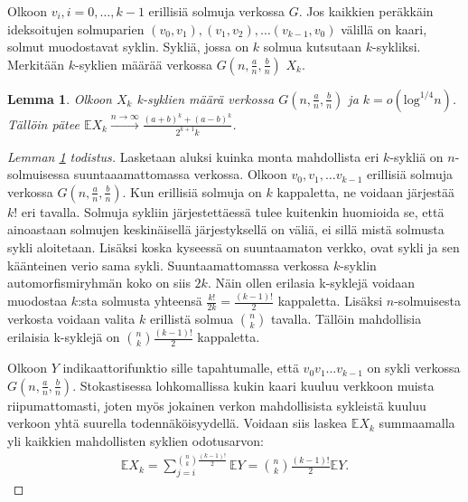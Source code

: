 \documentclass[finnish,12pt,a4paper,pdftex,sci,utf8]{aaltothesis}
\newtheorem{lemma}{Lemma}
\begin{document}
Olkoon $v_i, i = 0, \ldots, k-1$ erillisiä solmuja verkossa $G$. Jos kaikkien peräkkäin ideksoitujen solmuparien $(v_0, v_1), (v_1, v_2), \ldots (v_{k-1}, v_0)$ välillä on kaari, solmut muodostavat syklin. Sykliä, jossa on $k$ solmua kutsutaan $k$-sykliksi. Merkitään $k$-syklien määrää verkossa $G(n, \frac{a}{n}, \frac{b}{n})$ $X_k$.

\begin{lemma}
	\label{lemma:k-syklit_odotus}
	Olkoon $X_k$ k-syklien määrä verkossa $G(n,\frac{a}{n},\frac{b}{n})$ ja $k = o(\text{log}^{1/4}n)$. Tällöin pätee $\mathbb{E}X_k \xrightarrow{n \rightarrow \infty} \frac{(a+b)^k + (a-b)^k}{2^{k+1}k}$.
\end{lemma}

\begin{proof}[Lemman \ref{lemma:k-syklit_odotus} todistus]
	Lasketaan aluksi kuinka monta mahdollista eri $k$-sykliä on $n$-solmuisessa suuntaaamattomassa verkossa. Olkoon $v_0, v_1, \ldots v_{k-1}$ erillisiä solmuja verkossa $G(n,\frac{a}{n},\frac{b}{n})$. Kun erillisiä solmuja on $k$ kappaletta, ne voidaan järjestää $k!$ eri tavalla. Solmuja sykliin järjestettäessä tulee kuitenkin huomioida se, että ainoastaan solmujen keskinäisellä järjestyksellä on väliä, ei sillä mistä solmusta sykli aloitetaan. Lisäksi koska kyseessä on suuntaamaton verkko, ovat sykli ja sen käänteinen verio sama sykli. Suuntaamattomassa verkossa $k$-syklin automorfismiryhmän koko on siis $2k$. Näin ollen erilasia k-syklejä voidaan muodostaa $k$:sta solmusta yhteensä $\frac{k!}{2k} = \frac{(k-1)!}{2}$ kappaletta. Lisäksi $n$-solmuisesta verkosta voidaan valita $k$ erillistä solmua $\binom{n}{k}$ tavalla. Tällöin mahdollisia erilaisia k-syklejä on $\binom{n}{k} \frac{(k-1)!}{2}$ kappaletta.

	Olkoon $Y$ indikaattorifunktio sille tapahtumalle, että $v_0 v_1 \ldots v_{k-1}$ on sykli verkossa $G(n,\frac{a}{n}, \frac{b}{n})$. Stokastisessa lohkomallissa kukin kaari kuuluu verkkoon muista riipumattomasti, joten myös jokainen verkon mahdollisista sykleistä kuuluu verkoon yhtä suurella todennäköisyydellä. Voidaan siis laskea $\mathbb{E}X_k$ summaamalla yli kaikkien mahdollisten syklien odotusarvon:
	\begin{align*}
		\mathbb{E} X_k = \sum_{j = i}^{\binom{n}{k} \frac{(k-1)!}{2}} \mathbb{E} Y = \binom{n}{k} \frac{(k-1)!}{2} \mathbb{E} Y.
	\end{align*}


\end{proof}
\end{document}
